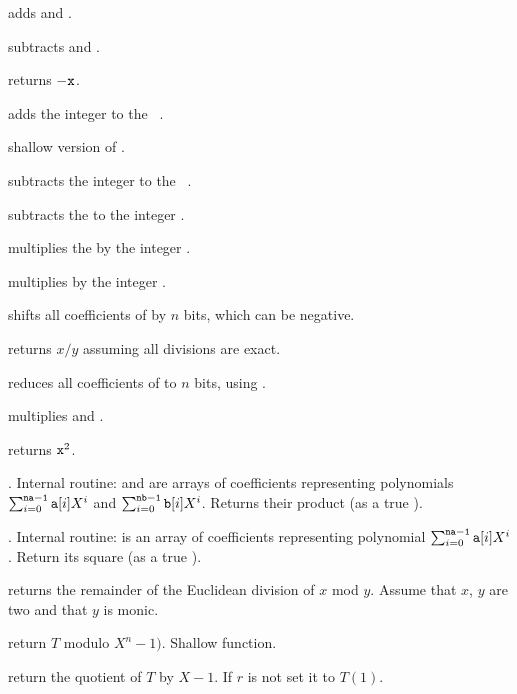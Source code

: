  adds  and .

 subtracts  and .

 returns $-{\tt x}$.

 adds the integer  to the
~.

 shallow version of .

 subtracts the integer  to the
~.

 subtracts the   to the
integer .

 multiplies the   by the
integer .

 multiplies  by the integer .

 shifts all coefficients of  by $n$
bits, which can be negative.

 returns $x/y$ assuming all divisions
are exact.

 reduces all coefficients of  to
$n$ bits, using .

 multiplies  and .

 returns ${\tt x}^2$.

. Internal routine:
 and  are arrays of coefficients representing polynomials
$\sum_{i = 0}^{{\tt na-1}} {\tt a}[i] X^i$ and
$\sum_{i = 0}^{{\tt nb-1}} {\tt b}[i] X^i$. Returns their product (as a true
).

. Internal routine:
 is an array of coefficients representing polynomial
$\sum_{i = 0}^{{\tt na-1}} {\tt a}[i] X^i$. Return its square (as a true
).

 returns the remainder of the Euclidean
division of $x$ mod $y$. Assume that $x$, $y$ are two  and that
$y$ is monic.

 return $T$ modulo $X^n - 1)$. Shallow
function.

 return the quotient of $T$ by $X-1$.
If $r$ is not  set it to $T(1)$.

